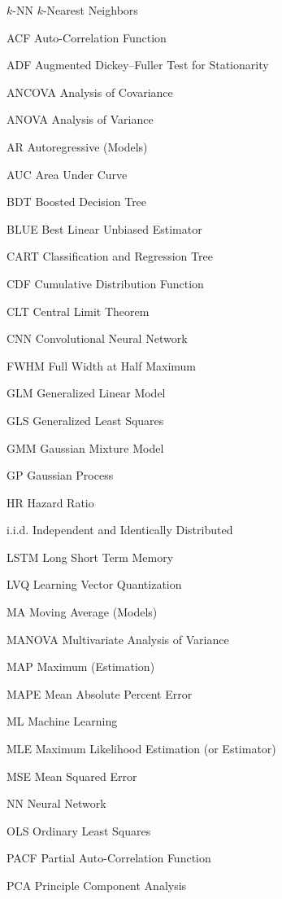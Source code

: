 \begin{symbollist}
	\item[$k$-NN] $k$-Nearest Neighbors
	\item[ACF] Auto-Correlation Function
	\item[ADF] Augmented Dickey--Fuller Test for Stationarity
	\item[ANCOVA] Analysis of Covariance
	\item[ANOVA] Analysis of Variance
	\item[AR] Autoregressive (Models)
	\item[AUC] Area Under Curve
	\item[BDT] Boosted Decision Tree
	\item[BLUE] Best Linear Unbiased Estimator
	\item[CART] Classification and Regression Tree
	\item[CDF] Cumulative Distribution Function
	\item[CLT] Central Limit Theorem
	\item[CNN] Convolutional Neural Network
	\item[FWHM] Full Width at Half Maximum
	\item[GLM] Generalized Linear Model
	\item[GLS] Generalized Least Squares
	\item[GMM] Gaussian Mixture Model
	\item[GP] Gaussian Process
	\item[HR] Hazard Ratio
	\item[i.i.d.] Independent and Identically Distributed
	\item[LSTM] Long Short Term Memory
	\item[LVQ] Learning Vector Quantization
	\item[MA] Moving Average (Models)
	\item[MANOVA] Multivariate Analysis of Variance
	\item[MAP] Maximum \aposteriori (Estimation)
	\item[MAPE] Mean Absolute Percent Error
	\item[ML] Machine Learning
	\item[MLE] Maximum Likelihood Estimation (or Estimator)
	\item[MSE] Mean Squared Error
	\item[NN] Neural Network
	\item[OLS] Ordinary Least Squares
	\item[PACF] Partial Auto-Correlation Function
	\item[PCA] Principle Component Analysis

\end{symbollist}
